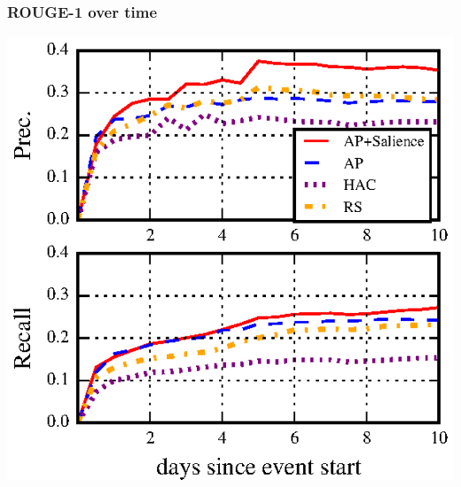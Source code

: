 \begin{frame}
\frametitle{ROUGE-1 over time}
\begin{center}
\includegraphics[]{images/rouge-time.eps}
\end{center}
\end{frame}


